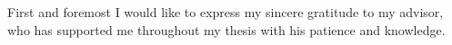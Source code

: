 \begin{ack}
First and foremost I would like to express my sincere gratitude to my advisor, who has supported 
me throughout my thesis with his patience and knowledge.
\end{ack}